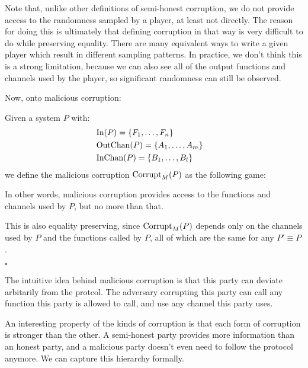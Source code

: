 Note that, unlike other definitions of semi-honest corruption,
we do not provide access to the randomness sampled by a player,
at least not directly.
The reason for doing this is ultimately that defining corruption
in that way is very difficult to do while preserving equality.
There are many equivalent ways to write a given player
which result in different sampling patterns.
In practice, we don't think this is a strong limitation,
because we can also see all of the output functions and
channels used by the player, so significant randomness can still
be observed.

Now, onto malicious corruption:

\begin{definition}
Given a system $P$ with:
$$
\begin{aligned}
  &\text{In}(P) = \{F_1, \ldots, F_n\}\cr
  &\text{OutChan}(P) = \{A_1, \ldots, A_m\}\cr
  &\text{InChan}(P) = \{B_1, \ldots, B_l\}\cr
\end{aligned}
$$
we define the malicious corruption $\text{Corrupt}_M(P)$ as the following game:

In other words, malicious corruption provides access to the functions
and channels used by $P$, but no more than that.

This is also equality preserving, since $\text{Corrupt}_M(P)$ depends
only on the channels used by $P$ and the functions called by $P$,
all of which are the same for any $P' \equiv P$.

$\square$
\end{definition}

The intuitive idea behind malicious corruption is that this party
can deviate arbitarily from the protcol.
The adversary corrupting this party can call any function this
party is allowed to call, and use any channel this party uses.

An interesting property of the kinds of corruption is that
each form of corruption is stronger than the other.
A semi-honest party provides more information than an honest
party, and a malicious party doesn't even need to follow
the protocol anymore.
We can capture this hierarchy formally.


